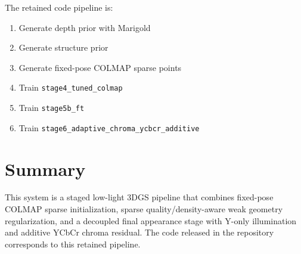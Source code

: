 \documentclass[10pt,a4paper]{article}
\begin{document}
The retained code pipeline is:
\begin{enumerate}[leftmargin=2em]
  \item Generate depth prior with Marigold
  \item Generate structure prior
  \item Generate fixed-pose COLMAP sparse points
  \item Train \texttt{stage4\_tuned\_colmap}
  \item Train \texttt{stage5b\_ft}
  \item Train \texttt{stage6\_adaptive\_chroma\_ycbcr\_additive}
\end{enumerate}

\section{Summary}
This system is a staged low-light 3DGS pipeline that combines fixed-pose COLMAP sparse initialization, sparse quality/density-aware weak geometry regularization, and a decoupled final appearance stage with Y-only illumination and additive YCbCr chroma residual. The code released in the repository corresponds to this retained pipeline.
\end{document}
